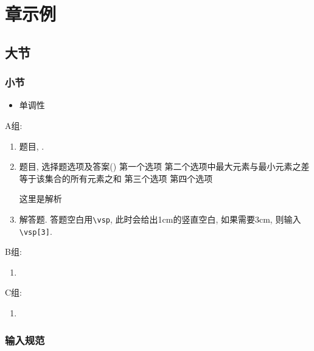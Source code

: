


\chapter{章示例} 


\section{大节}

\subsection{小节}
\zsd 
\begin{itemize}
\item 单调性
\end{itemize}

A组: 
\begin{enumerate}
\item 题目, . 

\item 题目, 选择题选项及答案\dotfill()
\xx
{第一个选项}
{第二个选项中最大元素与最小元素之差等于该集合的所有元素之和}
{第三个选项}
{第四个选项}
\begin{jieda}
这里是解析
\end{jieda}

\item 解答题. 答题空白用\verb|\vsp|, 此时会给出1cm的竖直空白, 如果需要3cm, 则输入\verb|\vsp[3]|. 
\vsp[3]

\end{enumerate}


B组: 
\begin{enumerate}
\item 

\end{enumerate}




C组: 
\begin{enumerate}
\item 

\end{enumerate}


\clearpage
\subsection{输入规范}

